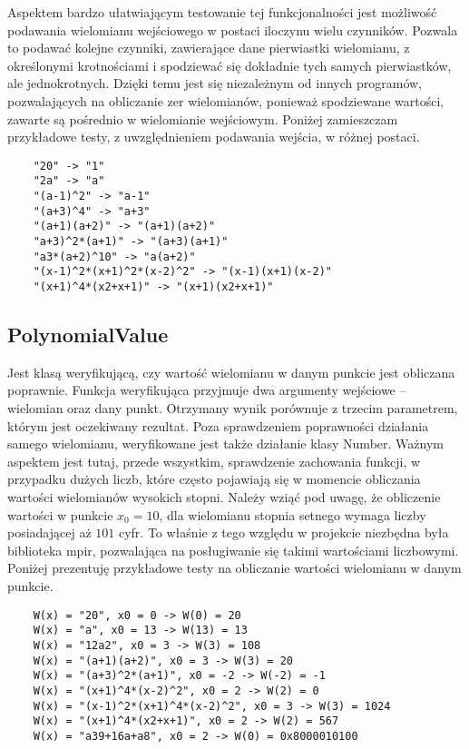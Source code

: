 \documentclass[oneside,a4paper]{book}
\begin{document}
	Aspektem bardzo ułatwiającym testowanie tej funkcjonalności jest możliwość podawania wielomianu wejściowego w postaci iloczynu wielu czynników. Pozwala to podawać kolejne czynniki, zawierające dane pierwiastki wielomianu, z określonymi krotnościami i spodziewać się dokładnie tych samych pierwiastków, ale jednokrotnych. Dzięki temu jest się niezależnym od innych programów, pozwalających na obliczanie zer wielomianów, ponieważ spodziewane wartości, zawarte są pośrednio w wielomianie wejściowym. Poniżej zamieszczam przykładowe testy, z uwzględnieniem podawania wejścia, w różnej postaci.
	
	\begin{lstlisting}
	"20" -> "1"
	"2a" -> "a"
	"(a-1)^2" -> "a-1"
	"(a+3)^4" -> "a+3"
	"(a+1)(a+2)" -> "(a+1)(a+2)"
	"a+3)^2*(a+1)" -> "(a+3)(a+1)"
	"a3*(a+2)^10" -> "a(a+2)"
	"(x-1)^2*(x+1)^2*(x-2)^2" -> "(x-1)(x+1)(x-2)"
	"(x+1)^4*(x2+x+1)" -> "(x+1)(x2+x+1)"
	\end{lstlisting}
	
	\subsection{PolynomialValue}
	
	Jest klasą weryfikującą, czy wartość wielomianu w danym punkcie jest obliczana poprawnie. Funkcja weryfikująca przyjmuje dwa argumenty wejściowe – wielomian oraz dany punkt. Otrzymany wynik porównuje z trzecim parametrem, którym jest oczekiwany rezultat. Poza sprawdzeniem poprawności działania samego wielomianu, weryfikowane jest także działanie klasy Number. Ważnym aspektem jest tutaj, przede wszystkim, sprawdzenie zachowania funkcji, w przypadku dużych liczb, które często pojawiają się w momencie obliczania wartości wielomianów wysokich stopni. Należy wziąć pod uwagę, że obliczenie wartości w punkcie $x_0=10$, dla wielomianu stopnia setnego wymaga liczby posiadającej aż $101$ cyfr. To właśnie z tego względu w projekcie niezbędna była biblioteka mpir, pozwalająca na posługiwanie się takimi wartościami liczbowymi. Poniżej prezentuję przykładowe testy na obliczanie wartości wielomianu w danym punkcie.
	
	\begin{lstlisting}
	W(x) = "20", x0 = 0 -> W(0) = 20
	W(x) = "a", x0 = 13 -> W(13) = 13
	W(x) = "12a2", x0 = 3 -> W(3) = 108
	W(x) = "(a+1)(a+2)", x0 = 3 -> W(3) = 20
	W(x) = "(a+3)^2*(a+1)", x0 = -2 -> W(-2) = -1
	W(x) = "(x+1)^4*(x-2)^2", x0 = 2 -> W(2) = 0
	W(x) = "(x-1)^2*(x+1)^4*(x-2)^2", x0 = 3 -> W(3) = 1024
	W(x) = "(x+1)^4*(x2+x+1)", x0 = 2 -> W(2) = 567
	W(x) = "a39+16a+a8", x0 = 2 -> W(0) = 0x8000010100
	\end{lstlisting}
	
\end{document}
